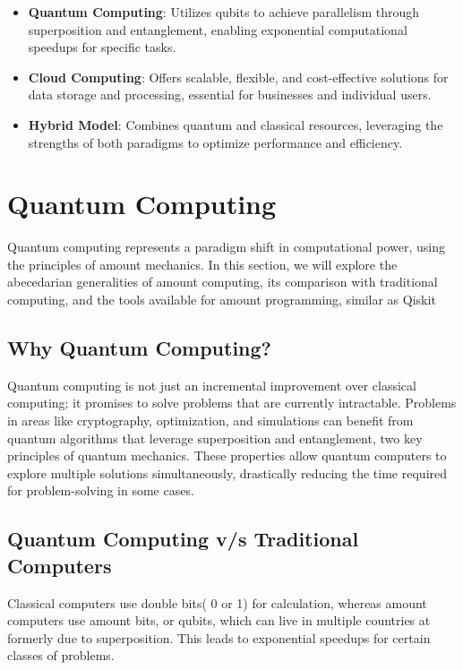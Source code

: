 \documentclass[conference]{IEEEtran}
\begin{document}
\begin{itemize}
    \item \textbf{Quantum Computing}: Utilizes qubits to achieve parallelism through superposition and entanglement, enabling exponential computational speedups for specific tasks.
    \item \textbf{Cloud Computing}: Offers scalable, flexible, and cost-effective solutions for data storage and processing, essential for businesses and individual users.
    \item \textbf{Hybrid Model}: Combines quantum and classical resources, leveraging the strengths of both paradigms to optimize performance and efficiency.
\end{itemize}

\section{Quantum Computing}

Quantum computing represents a paradigm shift in computational power, using the principles of amount mechanics. In this section, we will explore the abecedarian generalities of amount computing, its comparison with traditional computing, and the tools available for amount programming, similar as Qiskit

\subsection{Why Quantum Computing?}
Quantum computing is not just an incremental improvement over classical computing; it promises to solve problems that are currently intractable. Problems in areas like cryptography, optimization, and simulations can benefit from quantum algorithms that leverage superposition and entanglement, two key principles of quantum mechanics. These properties allow quantum computers to explore multiple solutions simultaneously, drastically reducing the time required for problem-solving in some cases.

\subsection{Quantum Computing v/s Traditional Computers}
 Classical computers use  double bits( 0 or 1) for  calculation, whereas amount computers use amount bits, or qubits, which can  live in multiple  countries at  formerly due to superposition. This leads to exponential speedups for certain classes of problems. 
\end{document}
